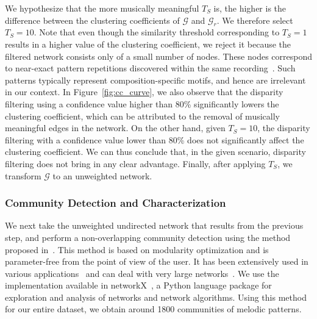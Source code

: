 We hypothesize that the more musically meaningful $T_S$ is, the higher is the difference between the clustering coefficients of $\mathcal{G}$ and $\mathcal{G}_r$. We therefore select $T_S=10$. Note that even though the similarity threshold corresponding to $T_S=1$ results in a higher value of the clustering coefficient, we reject it because the filtered network consists only of a small number of nodes. These nodes correspond to near-exact pattern repetitions discovered within the same recording~\cite{gulati_SITIS_2014}. Such patterns typically represent composition-specific motifs, and hence are irrelevant in our context. In Figure~\ref{fig:cc_curve}, we also observe that the disparity filtering using a confidence value higher than 80\% significantly lowers the clustering coefficient, which can be attributed to the removal of musically meaningful edges in the network. On the other hand, given $T_S=10$, the disparity filtering with a confidence value lower than 80\% does not significantly affect the clustering coefficient. We can thus conclude that, in the given scenario, disparity filtering does not bring in any clear advantage. Finally, after applying $T_S$, we transform $\mathcal{G}$ to an unweighted network. 


\subsubsection{Community Detection and Characterization}
\label{sec:community_detection}

We next take the unweighted undirected network that results from the previous step, and perform a non-overlapping community detection using the method proposed in~\cite{blondel2008fast}. This method is based on modularity optimization and is parameter-free from the point of view of the user. It has been extensively used in various applications~\cite{fortunato2010community} and can deal with very large networks~\cite{blondel2008fast}. We use the implementation available in networkX~\cite{hagberg-2008-exploring}, a Python language package for exploration and analysis of networks and network algorithms. Using this method for our entire dataset, we obtain around 1800 communities of melodic patterns. 

